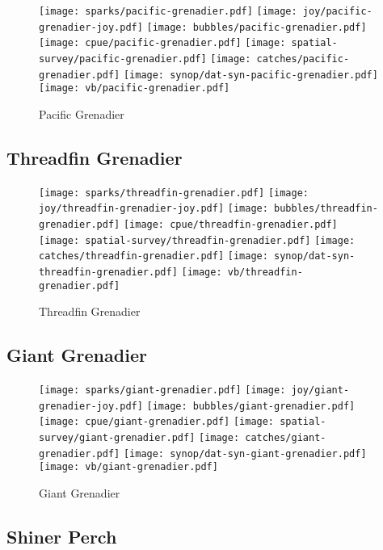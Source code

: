 \begin{figure}[htbp]
\centering
\texttt{[image: sparks/pacific-grenadier.pdf]}
\texttt{[image: joy/pacific-grenadier-joy.pdf]}
\texttt{[image: bubbles/pacific-grenadier.pdf]}
\texttt{[image: cpue/pacific-grenadier.pdf]}
\texttt{[image: spatial-survey/pacific-grenadier.pdf]}
\texttt{[image: catches/pacific-grenadier.pdf]}
\texttt{[image: synop/dat-syn-pacific-grenadier.pdf]}
\texttt{[image: vb/pacific-grenadier.pdf]}
\caption{Pacific Grenadier}
\end{figure}
\clearpage
\subsection*{Threadfin Grenadier}

\begin{figure}[htbp]
\centering
\texttt{[image: sparks/threadfin-grenadier.pdf]}
\texttt{[image: joy/threadfin-grenadier-joy.pdf]}
\texttt{[image: bubbles/threadfin-grenadier.pdf]}
\texttt{[image: cpue/threadfin-grenadier.pdf]}
\texttt{[image: spatial-survey/threadfin-grenadier.pdf]}
\texttt{[image: catches/threadfin-grenadier.pdf]}
\texttt{[image: synop/dat-syn-threadfin-grenadier.pdf]}
\texttt{[image: vb/threadfin-grenadier.pdf]}
\caption{Threadfin Grenadier}
\end{figure}
\clearpage
\subsection*{Giant Grenadier}

\begin{figure}[htbp]
\centering
\texttt{[image: sparks/giant-grenadier.pdf]}
\texttt{[image: joy/giant-grenadier-joy.pdf]}
\texttt{[image: bubbles/giant-grenadier.pdf]}
\texttt{[image: cpue/giant-grenadier.pdf]}
\texttt{[image: spatial-survey/giant-grenadier.pdf]}
\texttt{[image: catches/giant-grenadier.pdf]}
\texttt{[image: synop/dat-syn-giant-grenadier.pdf]}
\texttt{[image: vb/giant-grenadier.pdf]}
\caption{Giant Grenadier}
\end{figure}
\clearpage
\subsection*{Shiner Perch}

